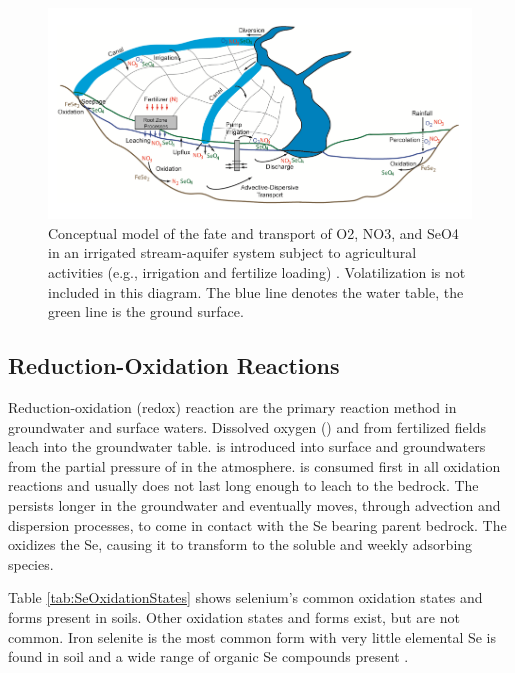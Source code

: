 \begin{linenumbers}[1]
\begin{figure}[htbp]
	\centering
	\includegraphics[scale=1]{"Figures/fateAndTransport"}
	\caption[Conceptual model of the fate and transport of O2, NO3, and SeO4 in an irrigated stream-aquifer system subject to agricultural activities.]{Conceptual model of the fate and transport of O2, NO3, and SeO4 in an irrigated stream-aquifer system subject to agricultural activities (e.g., irrigation and fertilize loading) \parencite{Bailey2012}.  Volatilization is not included in this diagram.  The blue line denotes the water table, the green line is the ground surface.}
	\label{fig:fateAndTransport}
\end{figure}

\subsection*{Reduction-Oxidation Reactions}
Reduction-oxidation (redox) reaction are the primary reaction method in groundwater and surface waters.  Dissolved oxygen (\dox) and \nitrate from fertilized fields leach into the groundwater table.   \dox is introduced into surface and groundwaters from the partial pressure of \dox in the atmosphere.  \dox is consumed first in all oxidation reactions and usually does not last long enough to leach to the bedrock.  The \nitrate persists longer in the groundwater and eventually moves, through advection and dispersion processes, to come in contact with the Se bearing parent bedrock.  The \nitrate oxidizes the Se, causing it to transform to the soluble and weekly adsorbing \selenate species.

Table \ref{tab:SeOxidationStates} shows selenium's common oxidation states and forms present in soils.  Other oxidation states and forms exist, but are not common.  Iron selenite is the most common form with very little elemental Se is found in soil and a wide range of organic Se compounds present \parencite{Painter1940}.


\end{linenumbers}
